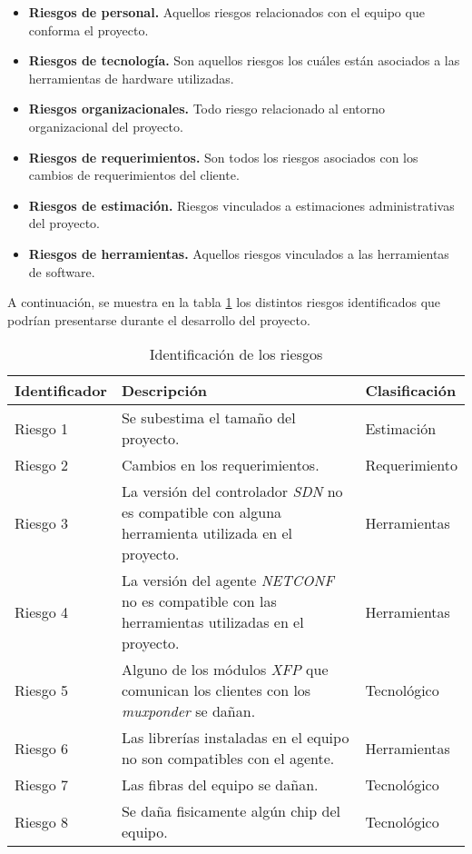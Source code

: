 \begin{itemize}
  \item \textbf{Riesgos de personal.} Aquellos riesgos relacionados con el equipo que conforma el proyecto.
	\item \textbf{Riesgos de tecnología.} Son aquellos riesgos los cuáles están asociados a las herramientas de hardware utilizadas.
  \item \textbf{Riesgos organizacionales.} Todo riesgo relacionado al entorno organizacional del proyecto.
  \item \textbf{Riesgos de requerimientos.} Son todos los riesgos asociados con los cambios de requerimientos del cliente.
  \item \textbf{Riesgos de estimación.} Riesgos vinculados a estimaciones administrativas del proyecto.
  \item \textbf{Riesgos de herramientas.} Aquellos riesgos vinculados a las herramientas de software.
\end{itemize}

A continuación, se muestra en la tabla \ref{tab:riesgos_identificados} los distintos riesgos identificados que podrían presentarse durante el desarrollo del proyecto.

\begin{table}[H]
  \centering
  \begin{tabular}{ |m{2.5cm}|m{7.5cm}|m{2.5cm}|  }
  
  \hline
  \centering
  \textbf{Identificador} & \textbf{Descripción} & \textbf{Clasificación} \\
  \hline
  \centering
  Riesgo 1 & Se subestima el tamaño del proyecto. & Estimación  \\
  \hline
  \centering
  Riesgo 2 & Cambios en los requerimientos. & Requerimiento  \\
  \hline
  \centering
  Riesgo 3 & La versión del controlador \textit{SDN} no es compatible con alguna herramienta utilizada en el proyecto. & Herramientas \\
  \hline
  \centering
  Riesgo 4 & La versión del agente \textit{NETCONF} no es compatible con las herramientas utilizadas en el proyecto. & Herramientas  \\
  \hline

  \centering
  Riesgo 5 & Alguno de los módulos \textit{XFP} que comunican los clientes con los \textit{muxponder} se dañan.  & Tecnológico  \\
  \hline

  \centering
  Riesgo 6 & Las librerías instaladas en el equipo no son compatibles con el agente. & Herramientas  \\
  \hline

  \centering
  Riesgo 7 & Las fibras del equipo se dañan. & Tecnológico  \\
  \hline

  \centering
  Riesgo 8 & Se daña fisicamente algún chip del equipo. & Tecnológico  \\
  \hline
  
  \end{tabular}
  \caption{Identificación de los riesgos}
  \label{tab:riesgos_identificados}
  \end{table}

